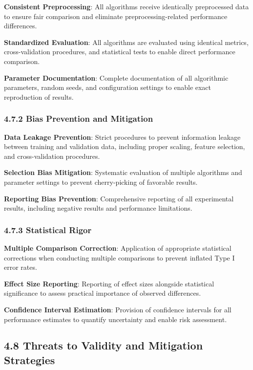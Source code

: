\documentclass[
  11pt,
  a4paper,
]{article}
\begin{document}
\textbf{Consistent Preprocessing}: All algorithms receive identically
preprocessed data to ensure fair comparison and eliminate
preprocessing-related performance differences.

\textbf{Standardized Evaluation}: All algorithms are evaluated using
identical metrics, cross-validation procedures, and statistical tests to
enable direct performance comparison.

\textbf{Parameter Documentation}: Complete documentation of all
algorithmic parameters, random seeds, and configuration settings to
enable exact reproduction of results.

\subsubsection{4.7.2 Bias Prevention and
Mitigation}\label{bias-prevention-and-mitigation}

\textbf{Data Leakage Prevention}: Strict procedures to prevent
information leakage between training and validation data, including
proper scaling, feature selection, and cross-validation procedures.

\textbf{Selection Bias Mitigation}: Systematic evaluation of multiple
algorithms and parameter settings to prevent cherry-picking of favorable
results.

\textbf{Reporting Bias Prevention}: Comprehensive reporting of all
experimental results, including negative results and performance
limitations.

\subsubsection{4.7.3 Statistical Rigor}\label{statistical-rigor}

\textbf{Multiple Comparison Correction}: Application of appropriate
statistical corrections when conducting multiple comparisons to prevent
inflated Type I error rates.

\textbf{Effect Size Reporting}: Reporting of effect sizes alongside
statistical significance to assess practical importance of observed
differences.

\textbf{Confidence Interval Estimation}: Provision of confidence
intervals for all performance estimates to quantify uncertainty and
enable risk assessment.

\subsection{4.8 Threats to Validity and Mitigation
Strategies}\label{threats-to-validity-and-mitigation-strategies}
\end{document}
